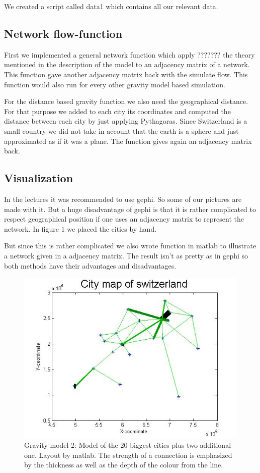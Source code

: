 \documentclass[11pt]{article}
\begin{document}
We created a script called data1 which contains all our relevant data.

\subsection{Network flow-function}
First we implemented a general network function which apply ??????? the theory mentioned in the description of the model to an adjacency matrix of a network. This function gave another adjacency matrix back with the simulate flow. This function would also run for every other gravity model based simulation.\newline

For the distance based gravity function we also need the geographical distance. For that purpose we added to each city its coordinates and computed the distance between each city by just applying Pythagoras. Since Switzerland is a small country we did not take in account that the earth is a sphere and just approximated as if it was a plane. The function gives again an adjacency matrix back.


\subsection{Visualization}
In the lectures it was recommended to use gephi. So some of our pictures are made with it. But a huge disadvantage of gephi is that it is rather complicated to respect geographical position if one uses an adjacency  matrix to represent the network. In figure 1 we placed the cities by hand.

But since this is rather complicated we also wrote function in matlab to illustrate a network given in a adjacency matrix. The result isn't as pretty as in gephi so both methods have their advantages and disadvantages.


\begin{figure}
\centering
\includegraphics[scale=0.5]{switzerland_network2}
 \caption{Gravity model 2: Model of the 20 biggest cities plus two additional one. Layout by matlab. The strength of a connection is emphasized by the thickness as well as the depth of the colour from the line.}
\end{figure}
\end{document}
